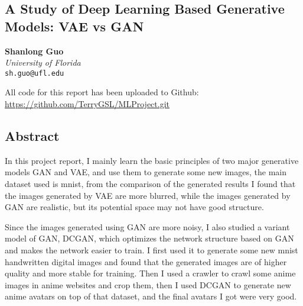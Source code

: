 \documentclass[
]{article}
\author{}
\date{}
\begin{document}
\begin{center}
\section{{A Study of Deep Learning Based Generative Models: VAE vs GAN}}
\end{center}

\begin{center}
\textbf{Shanlong Guo}\\
\textit{University of Florida}\\
\texttt{sh.guo@ufl.edu}
\end{center}




All code for this report has been uploaded to Github:
\url{https://github.com/TerryGSL/MLProject.git}

\begin{center}
\hypertarget{abstract}{%
\subsection{Abstract}\label{abstract}}
\end{center}


In this project report, I mainly learn the basic principles of two major
generative models GAN and VAE, and use them to generate some new images,
the main dataset used is mnist, from the comparison of the generated
results I found that the images generated by VAE are more blurred, while
the images generated by GAN are realistic, but its potential space may
not have good structure.

Since the images generated using GAN are more noisy, I also studied a
variant model of GAN, DCGAN, which optimizes the network structure based
on GAN and makes the network easier to train. I first used it to
generate some new mnist handwritten digital images and found that the
generated images are of higher quality and more stable for training.
Then I used a crawler to crawl some anime images in anime websites and
crop them, then I used DCGAN to generate new anime avatars on top of
that dataset, and the final avatars I got were very good.
\end{document}
